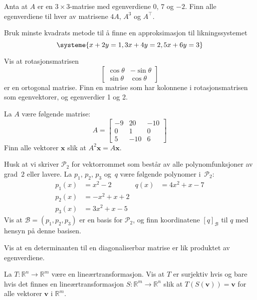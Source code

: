 \documentclass[titlepage,a4paper,12pt,norsk]{IMFeksamen}
\newcommand{\R}{\mathbb{R}}
\renewcommand{\P}{\mathcal{P}} %
\newcommand{\B}{\mathscr{B}} %
\DeclareMathOperator{\Sp}{Sp}
\newcommand{\tr}{^\top}
\newcommand{\V}[1]{\mathbf{#1}}
\newcommand{\vvv}[3]{\begin{bmatrix} #1 \\ #2 \\ #3 \end{bmatrix}}
\renewcommand{\v}{\V{v}}
\newcommand{\x}{\V{x}}
\newcommand{\0}{\V{0}}
\begin{document}
\begin{oppgave}
Anta at $A$ er en $3 \times 3$-matrise med egenverdiene $0$, $7$ og $-2$.
Finn alle egenverdiene til hver av matrisene $4A$, $A^3$ og $A\tr$.
\end{oppgave}


\begin{oppgave}
Bruk minste kvadrats metode til å finne en approksimasjon til likningssystemet
\[
\systeme{
x + 2y = 1,
3x + 4y = 2,
5x + 6y = 3
}
\]
\end{oppgave}


\begin{oppgave}
Vis at rotasjonsmatrisen 
\[
\begin{bmatrix}
\cos \theta  & -\sin \theta  \\  \sin \theta & \cos \theta 
\end{bmatrix}
\]
er en ortogonal matrise.  Finn en matrise som har kolonnene i rotasjonsmatrisen som egenvektorer, og egenverdier 1 og 2. \\
\end{oppgave}


\begin{oppgave}
La $A$ være følgende matrise:
\[
A =
\begin{bmatrix}
-9 &  20 & -10 \\
 0 &   1 &   0 \\
 5 & -10 &   6
\end{bmatrix}
\]
Finn alle vektorer $\x$ slik at $A^2 \x = A \x$.
\end{oppgave}


\begin{oppgave}
Husk at vi skriver $\P_2$ for vektorrommet som består av alle
polynomfunksjoner av grad~$2$ eller lavere.  La $p_1$, $p_2$, $p_3$
og~$q$ være følgende polynomer i~$\P_2$:
\begin{align*}
p_1(x) &= x^2 - 2    &   q(x) &= 4x^2 + x - 7  \\
p_2(x) &= -x^2 + x + 2 \\
p_3(x) &= 3x^2 + x - 5
\end{align*}
Vis at $\B = (p_1, p_2, p_3)$ er en basis for $\P_2$,
og finn koordinatene $[ q ]_\B$ til $q$ med hensyn på denne basisen.
\end{oppgave}


\begin{oppgave}
Vis at en determinanten til en diagonaliserbar matrise er lik produktet av egenverdiene.
\end{oppgave}


\begin{oppgave}
La $T \colon \R^n \to \R^m$ være en lineærtransformasjon.
Vis at $T$ er surjektiv hvis og bare hvis det finnes en
lineærtransformasjon $S \colon \R^m \to \R^n$ slik at
$T(S(\v)) = \v$ for alle vektorer $\v$ i $\R^m$.
\end{oppgave}
\end{document}
